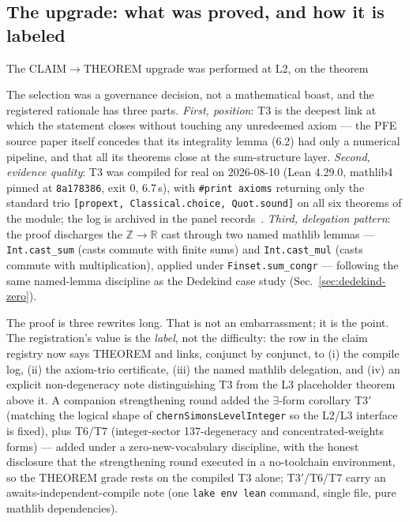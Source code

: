 \subsection{The upgrade: what was proved, and how it is labeled}
\label{sec:cs-upgrade}

The CLAIM$\to$THEOREM upgrade was performed at L2, on the theorem

\begin{center}
\end{center}

The selection was a governance decision, not a mathematical boast,
and the registered rationale has three parts.
\emph{First, position}: T3 is the deepest link at which the
statement closes without touching any unredeemed axiom --- the PFE
source paper itself concedes that its integrality lemma (6.2) had
only a numerical pipeline, and that all its theorems close at the
sum-structure layer. \emph{Second, evidence quality}: T3 was
compiled for real on 2026-08-10 (Lean 4.29.0, mathlib4 pinned at
\texttt{8a178386}, exit 0, 6.7\,s), with \texttt{\#print axioms}
returning only the standard trio \texttt{[propext,
Classical.choice, Quot.sound]} on all six theorems of the module;
the log is archived in the panel records~\cite{sylvacscompilelog}. \emph{Third,
delegation pattern}: the proof discharges the $\mathbb{Z}\to
\mathbb{R}$ cast through two named mathlib lemmas ---
\texttt{Int.cast\_sum} (casts commute with finite sums) and
\texttt{Int.cast\_mul} (casts commute with multiplication),
applied under \texttt{Finset.sum\_congr} --- following the same
named-lemma discipline as the Dedekind case study
(Sec.~\ref{sec:dedekind-zero}).

The proof is three rewrites long. That is not an embarrassment;
it is the point. The registration's value is the \emph{label}, not
the difficulty: the row in the claim registry now says THEOREM
and links, conjunct by conjunct, to (i) the compile log, (ii) the
axiom-trio certificate, (iii) the named mathlib delegation, and
(iv) an explicit non-degeneracy note distinguishing T3 from the
L3 placeholder theorem above it. A companion strengthening round
added the $\exists$-form corollary T3$'$ (matching the logical
shape of \texttt{chernSimonsLevelInteger} so the L2/L3 interface
is fixed), plus T6/T7 (integer-sector 137-degeneracy and
concentrated-weights forms) --- added under a
zero-new-vocabulary discipline, with the honest disclosure that
the strengthening round executed in a no-toolchain environment,
so the THEOREM grade rests on the compiled T3 alone; T3$'$/T6/T7
carry an awaits-independent-compile note (one \texttt{lake env
lean} command, single file, pure mathlib dependencies).

